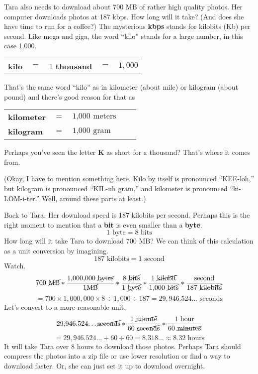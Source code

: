 Tara also needs to download about 700 MB of rather high quality photos.  Her computer downloads photos at 187 kbps.  How long will it take?  (And does she have time to run for a coffee?)  The mysterious \textbf{kbps} stands for kilobits (Kb) per second.  Like mega and giga, the word ``kilo'' stands for a large number, in this case 1,000.  
\begin{center}
\begin{tabular} {lclcr} 
\textbf{kilo} &$=$&1 \textbf{ thousand} &$=$&$ 1,000$\\
\end{tabular}
\end{center}
That's the same word ``kilo'' as in kilometer (about  mile) or kilogram (about  pound) and there's good reason for that as  
\begin{center}
\begin{tabular} {lclcr} 
\textbf{kilometer} &$=$&$ \text{1,000 meters}$\\
\textbf{kilogram} &$=$&$ \text{1,000 gram}$\\
\end{tabular}
\end{center}
Perhaps you've seen the letter \textbf{K} as short for a thousand?  That's where it comes from. 

(Okay, I have to mention something here.  Kilo by itself is pronounced ``KEE-loh,'' but kilogram is pronounced ``KIL-uh gram,'' and kilometer is pronounced ``ki-LOM-i-ter.''   Well, around these parts at least.)

Back to Tara.  Her download speed is 187 kilobits per second. Perhaps this is the right moment to mention that a \textbf{bit} is even smaller than a \textbf{byte}.
$$1 \text{ byte} = 8 \text{ bits}$$
How long will it take Tara to download 700 MB?  We can think of this calculation as a unit conversion by imagining.
$$187 \text{ kilobits} = 1 \text{ second}$$  Watch.
$$ 700 \text{ \cancel{MB}} 
\ast \frac{\text{1,000,000 \cancel{bytes}}}{1 \text{\cancel{MB}}}
\ast \frac{8 \text{ \cancel{bits}}}{1 \text{ \cancel{byte}}} 
\ast \frac{ 1 \text{ \cancel{kilobit}}}{\text{1,000 \cancel{bits}}}
\ast \frac{\text{second}} {187 \text{ \cancel{kilobits}}}
$$
$$= 700 \times 1,000,000 \times 8 \div 1,000 \div 187
= 29,946.524\ldots\text{ seconds} $$
Let's convert to a more reasonable unit.  
$$\text{29,946.524\ldots \cancel{seconds}} 
\ast \frac{1 \text{ \cancel{minute}}}{60 \text{ \cancel{seconds}}} 
\ast \frac{1 \text{ hour}}{60 \text{ \cancel{minutes}}} $$
$$ = 29,946.524\ldots \div 60 \div 60 = 8.318\ldots \approx 8.32 \text{ hours}$$
It will take Tara over 8 hours to download those photos.  
Perhaps Tara should compress the photos into a zip file or use lower resolution or find a way to download faster.  Or, she can just set it up to download overnight.  

